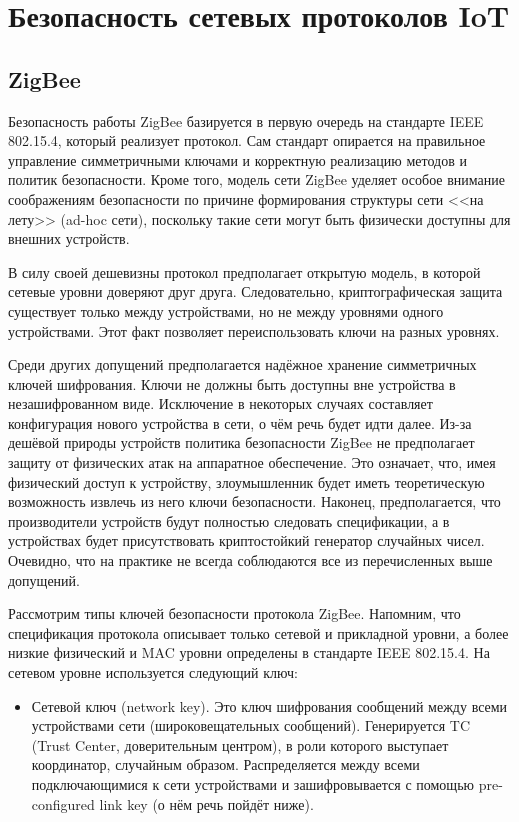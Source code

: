 \chapter{Безопасность сетевых протоколов IoT}

	\section{ZigBee}
	Безопасность работы ZigBee базируется в первую очередь на стандарте IEEE 802.15.4, который реализует
	протокол. Сам стандарт опирается на правильное управление симметричными ключами и корректную 
	реализацию методов и политик безопасности. Кроме того, модель сети ZigBee уделяет особое внимание 
	соображениям безопасности по причине формирования структуры сети <<на лету>> (ad-hoc сети), 
	поскольку такие сети могут быть физически доступны для внешних устройств.
	
	В силу своей дешевизны протокол предполагает открытую модель, в которой сетевые
	уровни доверяют друг друга. Следовательно, криптографическая защита существует только между
	устройствами, но не между уровнями одного устройствами. Этот факт позволяет переиспользовать
	ключи на разных уровнях.
	
	Среди других допущений предполагается надёжное хранение симметричных ключей шифрования.
	Ключи не должны быть доступны вне устройства в незашифрованном виде. Исключение в некоторых 
	случаях составляет конфигурация нового устройства в сети, о чём речь будет идти далее. Из-за
	дешёвой природы устройств политика безопасности ZigBee не предполагает защиту от физических
	атак на аппаратное обеспечение. Это означает, что, имея физический доступ к устройству, 
	злоумышленник будет иметь теоретическую возможность извлечь из него ключи безопасности.
	Наконец, предполагается, что производители устройств будут полностью следовать спецификации,
	а в устройствах будет присутствовать криптостойкий генератор случайных чисел. Очевидно, что
	на практике не всегда соблюдаются все из перечисленных выше допущений.
	
	Рассмотрим типы ключей безопасности протокола ZigBee. Напомним, что спецификация протокола
	описывает только сетевой и прикладной уровни, а более низкие физический и MAC уровни определены
	в стандарте IEEE 802.15.4. На сетевом уровне используется следующий ключ:
	
	\begin{itemize}
		\item Сетевой ключ (network key). Это ключ шифрования сообщений между всеми устройствами сети 
		(широковещательных сообщений). Генерируется TC (Trust Center, доверительным центром), в роли 
		которого выступает координатор, случайным образом. Распределяется между всеми подключающимися 
		к сети устройствами и зашифровывается с помощью pre-configured link key (о нём речь пойдёт ниже).
	\end{itemize}

